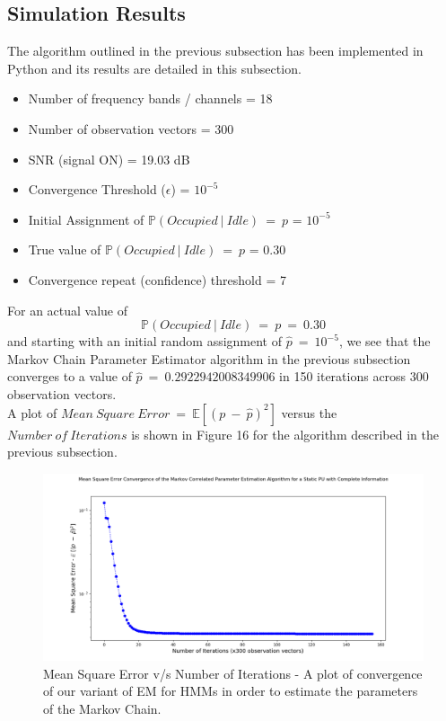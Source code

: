 \documentclass[12pt, draftcls, onecolumn]{IEEEtran}
\begin{document}
\subsection{Simulation Results}
The algorithm outlined in the previous subsection has been implemented in Python and its results are detailed in this subsection.
\begin{itemize}
    \item Number of frequency bands / channels = 18
    \item Number of observation vectors = 300
    \item SNR (signal ON) = 19.03 dB
    \item Convergence Threshold ($\epsilon$) = $10^{-5}$
    \item Initial Assignment of $\mathbb{P}(Occupied\ |\ Idle)\ =\ p$ = $10^{-5}$
    \item True value of $\mathbb{P}(Occupied\ |\ Idle)\ =\ p$ = 0.30
    \item Convergence repeat (confidence) threshold = 7
\end{itemize}
For an actual value of
\[\mathbb{P}(Occupied\ |\ Idle)\ =\ p\ =\ 0.30\]
and starting with an initial random assignment of $\hat{p}\ =\ 10^{-5}$, we see that the Markov Chain Parameter Estimator algorithm in the previous subsection converges to a value of $\hat{p}\ =\ 0.2922942008349906$ in 150 iterations across 300 observation vectors.
\\A plot of $Mean\ Square\ Error\ =\ \mathbb{E}[(p\ -\ \hat{p})^2]$ versus the $Number\ of\ Iterations$ is shown in Figure 16 for the algorithm described in the previous subsection.
\begin{figure}[t]
\includegraphics[width=1.0\textwidth]{Mean_Square_Plot_Log_Scale.png}
\caption{Mean Square Error v/s Number of Iterations - A plot of convergence of our variant of EM for HMMs in order to estimate the parameters of the Markov Chain.}
\label{fig:mesh16}
\centering
\end{figure}
\end{document}
